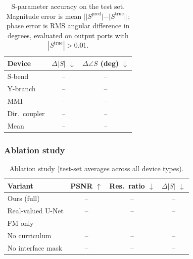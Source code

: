 
\begin{table}[t]
\centering
\caption{S-parameter accuracy on the test set. Magnitude error is mean $||S^\text{pred}| - |S^\text{true}||$; phase
error is RMS angular difference in degrees, evaluated on output ports with $|S^\text{true}| > 0.01$.}
\label{tab:sparam}
\begin{tabular}{lcc}
\hline\hline
Device & $\Delta|S|$ $\downarrow$ & $\Delta\angle S$ (deg) $\downarrow$ \\
\hline
S-bend          & -- & -- \\
Y-branch        & -- & -- \\
MMI             & -- & -- \\
Dir.\ coupler   & -- & -- \\
\hline
Mean            & -- & -- \\
\hline\hline
\end{tabular}
\end{table}

\subsubsection{Ablation study}


\begin{table}[t]
\centering
\caption{Ablation study (test-set averages across all device types).}
\label{tab:ablation}
\begin{tabular}{lccc}
\hline\hline
Variant & PSNR $\uparrow$ & Res.\ ratio $\downarrow$ & $\Delta|S|$ $\downarrow$ \\
\hline
Ours (full)           & -- & -- & -- \\
Real-valued U-Net     & -- & -- & -- \\
FM only               & -- & -- & -- \\
No curriculum         & -- & -- & -- \\
No interface mask     & -- & -- & -- \\
\hline\hline
\end{tabular}
\end{table}

